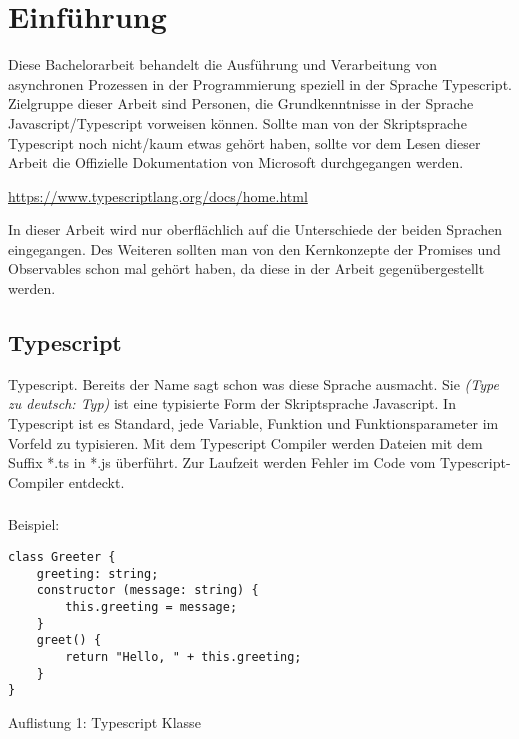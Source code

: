 \setcounter{secnumdepth}{1}
\section{Einführung}
Diese Bachelorarbeit behandelt die Ausführung und Verarbeitung von asynchronen Prozessen in der Programmierung speziell in der Sprache Typescript.\\
Zielgruppe dieser Arbeit sind Personen, die Grundkenntnisse in der Sprache Javascript/Typescript vorweisen können.
Sollte man von der Skriptsprache Typescript noch nicht/kaum etwas gehört haben, sollte vor dem Lesen dieser Arbeit die Offizielle Dokumentation von Microsoft durchgegangen werden.

\begin{center}
\url{https://www.typescriptlang.org/docs/home.html}
\end{center}

In dieser Arbeit wird nur oberflächlich auf die Unterschiede der beiden Sprachen eingegangen. Des Weiteren sollten man von den  Kernkonzepte der Promises und Observables schon mal gehört haben, da diese in der Arbeit gegenübergestellt werden.

\subsection{Typescript}
Typescript. Bereits der Name sagt schon was diese Sprache ausmacht. Sie   \textit{(\glqq{}Type\grqq{} zu deutsch: Typ)} ist eine typisierte Form der Skriptsprache Javascript. In Typescript ist es Standard, jede Variable, Funktion und Funktionsparameter im Vorfeld zu typisieren. Mit dem Typescript Compiler werden Dateien mit dem Suffix *.ts in *.js überführt. Zur Laufzeit werden Fehler im Code vom Typescript-Compiler entdeckt.

\subsubsection{}{Beispiel}:
\medskip
\begin{lstlisting}
class Greeter {
    greeting: string;
    constructor (message: string) {
        this.greeting = message;
    }
    greet() {
        return "Hello, " + this.greeting;
    }
}  
\end{lstlisting}

\begin{center}
    \large{Auflistung 1: Typescript Klasse}
\end{center}


